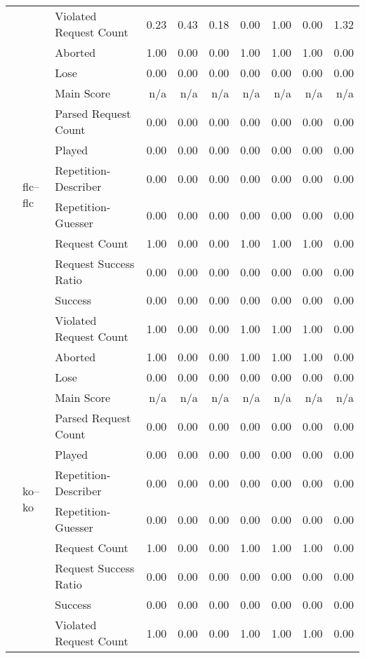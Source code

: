 \begin{tabular}{lllrrrrrrr}
 &  & Violated Request Count & 0.23 & 0.43 & 0.18 & 0.00 & 1.00 & 0.00 & 1.32 \\
\cline{2-10}
 & \multirow[t]{11}{*}{flc--flc} & Aborted & 1.00 & 0.00 & 0.00 & 1.00 & 1.00 & 1.00 & 0.00 \\
 &  & Lose & 0.00 & 0.00 & 0.00 & 0.00 & 0.00 & 0.00 & 0.00 \\
 &  & Main Score & n/a & n/a & n/a & n/a & n/a & n/a & n/a \\
 &  & Parsed Request Count & 0.00 & 0.00 & 0.00 & 0.00 & 0.00 & 0.00 & 0.00 \\
 &  & Played & 0.00 & 0.00 & 0.00 & 0.00 & 0.00 & 0.00 & 0.00 \\
 &  & Repetition-Describer & 0.00 & 0.00 & 0.00 & 0.00 & 0.00 & 0.00 & 0.00 \\
 &  & Repetition-Guesser & 0.00 & 0.00 & 0.00 & 0.00 & 0.00 & 0.00 & 0.00 \\
 &  & Request Count & 1.00 & 0.00 & 0.00 & 1.00 & 1.00 & 1.00 & 0.00 \\
 &  & Request Success Ratio & 0.00 & 0.00 & 0.00 & 0.00 & 0.00 & 0.00 & 0.00 \\
 &  & Success & 0.00 & 0.00 & 0.00 & 0.00 & 0.00 & 0.00 & 0.00 \\
 &  & Violated Request Count & 1.00 & 0.00 & 0.00 & 1.00 & 1.00 & 1.00 & 0.00 \\
\cline{2-10}
 & \multirow[t]{11}{*}{ko--ko} & Aborted & 1.00 & 0.00 & 0.00 & 1.00 & 1.00 & 1.00 & 0.00 \\
 &  & Lose & 0.00 & 0.00 & 0.00 & 0.00 & 0.00 & 0.00 & 0.00 \\
 &  & Main Score & n/a & n/a & n/a & n/a & n/a & n/a & n/a \\
 &  & Parsed Request Count & 0.00 & 0.00 & 0.00 & 0.00 & 0.00 & 0.00 & 0.00 \\
 &  & Played & 0.00 & 0.00 & 0.00 & 0.00 & 0.00 & 0.00 & 0.00 \\
 &  & Repetition-Describer & 0.00 & 0.00 & 0.00 & 0.00 & 0.00 & 0.00 & 0.00 \\
 &  & Repetition-Guesser & 0.00 & 0.00 & 0.00 & 0.00 & 0.00 & 0.00 & 0.00 \\
 &  & Request Count & 1.00 & 0.00 & 0.00 & 1.00 & 1.00 & 1.00 & 0.00 \\
 &  & Request Success Ratio & 0.00 & 0.00 & 0.00 & 0.00 & 0.00 & 0.00 & 0.00 \\
 &  & Success & 0.00 & 0.00 & 0.00 & 0.00 & 0.00 & 0.00 & 0.00 \\
 &  & Violated Request Count & 1.00 & 0.00 & 0.00 & 1.00 & 1.00 & 1.00 & 0.00 \\

\end{tabular}

